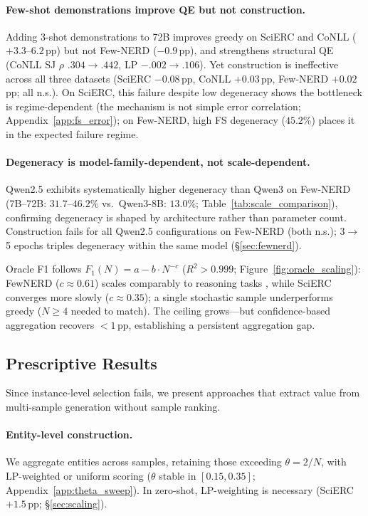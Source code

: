 \paragraph{Few-shot demonstrations improve QE but not construction.}
Adding 3-shot demonstrations to 72B improves greedy on SciERC and CoNLL ($+3.3$--$6.2$\,pp) but not Few-NERD ($-0.9$\,pp), and strengthens structural QE (CoNLL SJ $\rho$ $.304{\to}.442$, LP $-.002{\to}.106$). Yet construction is ineffective across all three datasets (SciERC $-0.08$\,pp, CoNLL $+0.03$\,pp, Few-NERD $+0.02$\,pp; all n.s.). On SciERC, this failure despite low degeneracy shows the bottleneck is regime-dependent (the mechanism is not simple error correlation; Appendix~\ref{app:fs_error}); on Few-NERD, high FS degeneracy ($45.2$\%) places it in the expected failure regime.

\paragraph{Degeneracy is model-family-dependent, not scale-dependent.}
Qwen2.5 exhibits systematically higher degeneracy than Qwen3 on Few-NERD (7B--72B: $31.7$--$46.2$\% vs.\ Qwen3-8B: $13.0$\%; Table~\ref{tab:scale_comparison}), confirming degeneracy is shaped by architecture rather than parameter count. Construction fails for all Qwen2.5 configurations on Few-NERD (both n.s.); 3$\to$5 epochs triples degeneracy within the same model (\S\ref{sec:fewnerd}).

Oracle F1 follows $F_1(N) = a - b \cdot N^{-c}$ ($R^2 > 0.999$; Figure~\ref{fig:oracle_scaling}): FewNERD ($c{\approx}0.61$) scales comparably to reasoning tasks \cite{brown2024monkeys}, while SciERC converges more slowly ($c{\approx}0.35$); a single stochastic sample underperforms greedy ($N{\geq}4$ needed to match).
The ceiling grows---but confidence-based aggregation recovers ${<}1$\,pp, establishing a persistent aggregation gap.

\subsection{Prescriptive Results}
\label{sec:prescriptive}

Since instance-level selection fails, we present approaches that extract value from multi-sample generation without sample ranking.

\paragraph{Entity-level construction.}
We aggregate entities across samples, retaining those exceeding $\theta{=}2/N$, with LP-weighted or uniform scoring ($\theta$ stable in $[0.15, 0.35]$; Appendix~\ref{app:theta_sweep}). In zero-shot, LP-weighting is necessary (SciERC $+1.5$\,pp; \S\ref{sec:scaling}).

